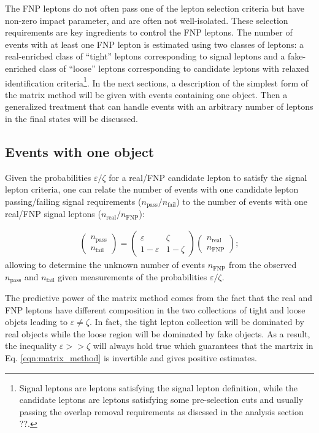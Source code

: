 The FNP leptons do not often pass one of the 
lepton selection criteria but have non-zero impact parameter, and are often not 
well-isolated. These selection requirements are key ingredients to control the FNP leptons. 
The number of events with at least one FNP lepton is estimated using two classes of leptons: 
a real-enriched class of ``tight'' leptons corresponding to signal leptons and a fake-enriched class of ``loose'' leptons 
corresponding to candidate leptons with relaxed identification criteria\footnote{Signal leptons are leptons satisfying the signal lepton definition, while the candidate leptons are leptons satisfying some pre-selection cuts and usually passing the overlap removal requirements as discssed in the analysis section ??.}. 
In the next sections, a description of the simplest form of the matrix method will be given with events containing one object. 
Then a generalized treatment that can handle events with an arbitrary number of leptons in the final states will be discussed.

\subsection{Events with one object}

Given the probabilities $\varepsilon/\zeta$ for a real/FNP candidate lepton to satisfy the signal lepton criteria, 
one can relate the number of events with one candidate lepton passing/failing signal requirements ($n_\text{pass}/n_\text{fail}$) to the number of events with one real/FNP signal leptons ($n_\text{real}/n_\text{FNP}$):

\begin{align}
\begin{pmatrix}n_\text{pass}\\n_\text{fail}\end{pmatrix} 
= \begin{pmatrix}\varepsilon & \zeta\\ 1-\varepsilon & 1-\zeta\end{pmatrix}
\begin{pmatrix}n_\text{real}\\n_\text{FNP}\end{pmatrix}; 
\label{eqn:matrix_method}
\end{align}
allowing to determine the unknown number of events $n_\text{FNP}$ from the observed $n_\text{pass}$ and $n_\text{fail}$ given measurements of the 
probabilities $\varepsilon/\zeta$. 

The predictive power of the matrix method comes from the fact that 
the real and FNP leptons have different composition in the two collections 
of tight and loose objets leading to $\varepsilon \neq \zeta$. In fact, 
the tight lepton collection will be dominated by real objects while the 
loose region will be dominated by fake objects. As a result, 
the inequality $\varepsilon >> \zeta$ will always hold true which 
guarantees that the martrix in Eq. \ref{eqn:matrix_method} is invertible 
and gives positive estimates. 

